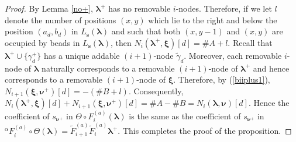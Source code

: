 \documentclass[a4paper,10pt]{amsart}
\theoremstyle{plain}
\def\bs{{\boldsymbol{s}}}
\def\bxi{{\boldsymbol \xi}}
\def\blam{{\boldsymbol \lambda}}
\def\bnu{{\boldsymbol \nu}}
\theoremstyle{plain}
\numberwithin{equation}{section}
\begin{document}
\begin{proof}




By Lemma \ref{no+}, $\blam^+$ has no removable $i$-nodes.
Therefore, if we let $l$ denote the number of positions \((x,y)\) which lie to the right and below the position \((a_d,b_d)\) in \(L_\bs(\blam)\) and such that both \((x,y-1)\) and \((x,y)\) are occupied by beads in \(L_\bs(\blam)\), then $N_i(\blam^+, \bxi)[d]=\#A+l$.
Recall that $\blam^{+}\cup\{\gamma^+_d\}$ has a unique addable $(i+1)$-node $\tilde \gamma_d$.
Moreover, each removable $i$-node of $\blam$ naturally corresponds to a removable $(i+1)$-node of $\blam^+$ and hence corresponds to a removable $(i+1)$-node of $\bxi$. Therefore, by (\ref{biiplus1}), $N_{i+1}(\bxi, \bnu^+)[d]=-(\#B+l)$. Consequently, $N_i(\blam^+,\bxi)[d]+N_{i+1} (\bxi,\bnu^+)[d]=\#A-\#B=N_i(\blam, \bnu)[d]$.
Hence the coefficient of $s_{\bnu^+}$ in $\varTheta\circ F_i^{(a)}(\blam)$ is the same as the coefficient of $s_{\bnu^+}$ in ${^\alpha}\!F_i^{(a)}\circ \varTheta(\blam)=\tilde{F}^{(a)}_{i+1}\tilde{F}^{(a)}_i \blam^+$.
This completes the proof of the proposition.
\end{proof}
\end{document}
